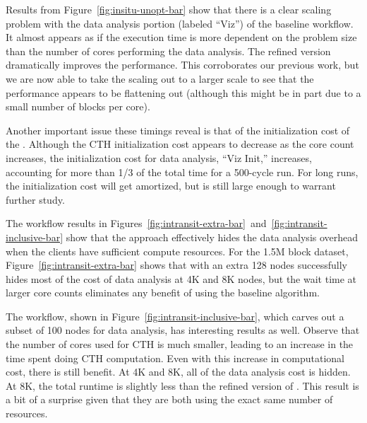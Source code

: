 Results from Figure~\ref{fig:insitu-unopt-bar} show that there is a clear
scaling problem with the data analysis portion (labeled ``Viz'') of the
baseline \insitu workflow.  It almost appears as if the execution time is
more dependent on the problem size than the number of cores performing the
data analysis.  The refined version dramatically improves the performance.
This corroborates our previous work, but we are now able
to take the scaling out to a larger scale to see that the performance
appears to be flattening out (although this might be in part due to a small
number of blocks per core).

Another important issue these timings reveal is that of the initialization
cost of the \vda.  Although the CTH initialization cost appears to decrease
as the core count increases, the initialization cost for data analysis,
``Viz Init,'' increases, accounting for more than 1/3 of the total time for
a 500-cycle run.  For long runs, the initialization cost will get
amortized, but is still large enough to warrant further study.

The \intransit workflow results in
Figures~\ref{fig:intransit-extra-bar}~and~\ref{fig:intransit-inclusive-bar}
show that the \intransit approach effectively hides the data analysis
overhead when the clients have sufficient compute resources.  For the 1.5M
block dataset, Figure~\ref{fig:intransit-extra-bar} shows that \intransit
with an extra 128 nodes successfully hides most of the cost of data
analysis at 4K and 8K nodes, but the wait time at larger core counts
eliminates any benefit of \intransit using the baseline algorithm.

The \intransit workflow, shown in Figure~\ref{fig:intransit-inclusive-bar},
which carves out a subset of 100 nodes for data analysis, has interesting
results as well.  Observe that the number of cores used for CTH is much
smaller, leading to an increase in the time spent doing CTH computation.
Even with this increase in computational cost, there is still benefit.  At
4K and 8K, all of the data analysis cost is hidden.  At 8K, the total
runtime is slightly less than the refined version of \insitu.  This result
is a bit of a surprise given that they are both using the exact same number
of resources.


